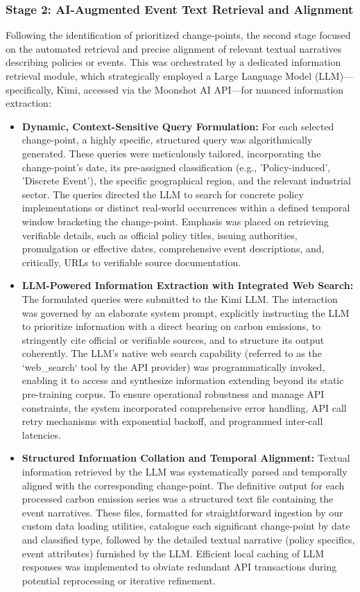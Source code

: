 \subsubsection{Stage 2: AI-Augmented Event Text Retrieval and Alignment}
\label{subsubsec:EventTextRetrieval}
Following the identification of prioritized change-points, the second stage focused on the automated retrieval and precise alignment of relevant textual narratives describing policies or events. This was orchestrated by a dedicated information retrieval module, which strategically employed a Large Language Model (LLM)—specifically, Kimi, accessed via the Moonshot AI API—for nuanced information extraction:
\begin{itemize}
\item \textbf{Dynamic, Context-Sensitive Query Formulation:} For each selected change-point, a highly specific, structured query was algorithmically generated. These queries were meticulously tailored, incorporating the change-point's date, its pre-assigned classification (e.g., 'Policy-induced', 'Discrete Event'), the specific geographical region, and the relevant industrial sector. The queries directed the LLM to search for concrete policy implementations or distinct real-world occurrences within a defined temporal window bracketing the change-point. Emphasis was placed on retrieving verifiable details, such as official policy titles, issuing authorities, promulgation or effective dates, comprehensive event descriptions, and, critically, URLs to verifiable source documentation.
    \item \textbf{LLM-Powered Information Extraction with Integrated Web Search:} The formulated queries were submitted to the Kimi LLM. The interaction was governed by an elaborate system prompt, explicitly instructing the LLM to prioritize information with a direct bearing on carbon emissions, to stringently cite official or verifiable sources, and to structure its output coherently. The LLM's native web search capability (referred to as the `web\_search` tool by the API provider) was programmatically invoked, enabling it to access and synthesize information extending beyond its static pre-training corpus. To ensure operational robustness and manage API constraints, the system incorporated comprehensive error handling, API call retry mechanisms with exponential backoff, and programmed inter-call latencies.
    \item \textbf{Structured Information Collation and Temporal Alignment:} Textual information retrieved by the LLM was systematically parsed and temporally aligned with the corresponding change-point. The definitive output for each processed carbon emission series was a structured text file containing the event narratives. These files, formatted for straightforward ingestion by our custom data loading utilities, catalogue each significant change-point by date and classified type, followed by the detailed textual narrative (policy specifics, event attributes) furnished by the LLM. Efficient local caching of LLM responses was implemented to obviate redundant API transactions during potential reprocessing or iterative refinement.
\end{itemize}


